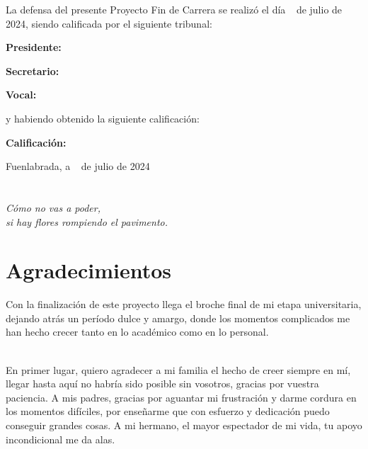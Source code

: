 \documentclass[a4paper, 12pt]{book}
\begin{document}
\vspace{1cm}
La defensa del presente Proyecto Fin de Carrera se realizó el día \qquad$\;\,$ de julio de 2024, siendo calificada por el siguiente tribunal:


\vspace{0.5cm}
\textbf{Presidente:}

\vspace{1.2cm}
\textbf{Secretario:}

\vspace{1.2cm}
\textbf{Vocal:}


\vspace{1.2cm}
y habiendo obtenido la siguiente calificación:

\vspace{1cm}
\textbf{Calificación:}


\vspace{1cm}
\begin{flushright}
Fuenlabrada, a \qquad$\;\,$ de julio de 2024
\end{flushright}


\chapter*{}
\begin{flushright}
\textit{Cómo no vas a poder,}
\\\textit{si hay flores rompiendo el pavimento.}
\end{flushright}


\chapter*{Agradecimientos}

Con la finalización de este proyecto llega el broche final de mi etapa universitaria, dejando atrás un período dulce y amargo,
donde los momentos complicados me han hecho crecer tanto en lo académico como en lo personal.

\\En primer lugar, quiero agradecer a mi familia el hecho de creer siempre en mí, llegar hasta aquí no habría sido posible sin vosotros,
gracias por vuestra paciencia. A mis padres, gracias por aguantar mi frustración y darme cordura en los momentos difíciles, por enseñarme
que con esfuerzo y dedicación puedo conseguir grandes cosas. A mi hermano, el mayor espectador de mi vida, tu apoyo incondicional me da alas.
\end{document}
